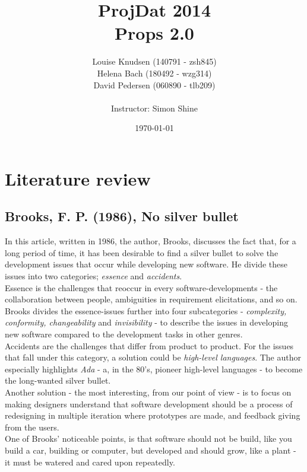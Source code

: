 \documentclass[12pt]{article}
\title{ProjDat 2014\\Props 2.0}
\author{Louise Knudsen (140791 - zsh845)\\
Helena Bach (180492 - wzg314)\\
David Pedersen (060890 - tlb209)\\\\
Instructor: Simon Shine }
\date{\today}
\begin{document}
\maketitle
\newpage
\section*{Literature review}
\subsection*{Brooks, F. P. (1986), No silver bullet}
In this article, written in 1986, the author, Brooks, discusses the fact that, for a long period of time, it has been desirable to find a silver bullet to solve the development issues that occur while developing new software. He divide these issues into two categories; \textit{essence} and \textit{accidents}. \\
Essence is the challenges that reoccur in every software-developments - the collaboration between people, ambiguities in requirement elicitations, and so on. \\
Brooks divides the essence-issues further into four subcategories - \textit{complexity, conformity, changeability} and \textit{invisibility} - to describe the issues in developing new software compared to the development tasks in other genres. \\
Accidents are the challenges that differ from product to product. For the issues that fall under this category, a solution could be \textit{high-level languages}. The author especially highlights \textit{Ada} - a, in the 80's, pioneer high-level languages - to become the long-wanted silver bullet.\\
Another solution - the most interesting, from our point of view - is to focus on making designers understand that software development should be a process of redesigning in multiple iteration where prototypes are made, and feedback giving from the users. \\
One of Brooks' noticeable points, is that software should not be build, like you build a car, building or computer, but developed and should grow, like a plant - it must be watered and cared upon repeatedly.   
\end{document}
